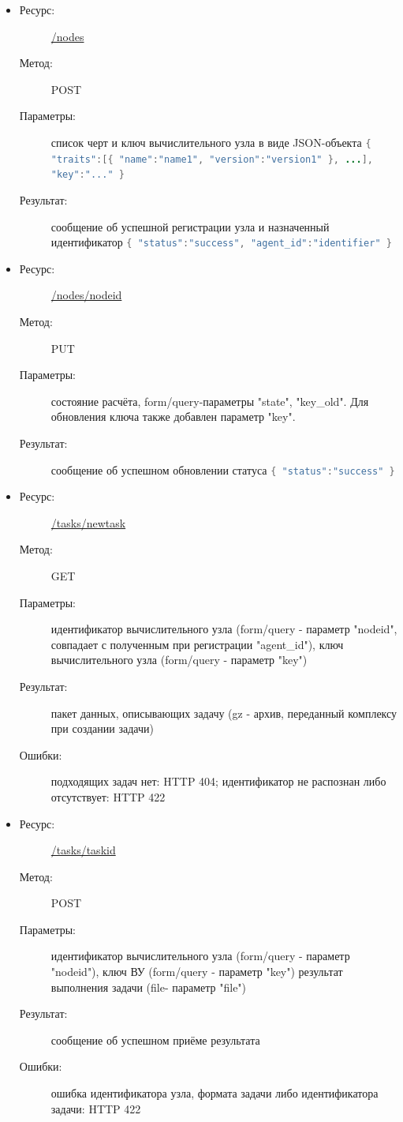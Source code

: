 \documentclass[a4paper,12pt]{report}
\numberwithin{equation}{section}
\begin{document}
  \begin{itemize}
    \item
    \begin{description}
      \item[Ресурс:] \url{/nodes}
      \item[Метод:] POST
      \item[Параметры:] список черт и ключ вычислительного узла в виде JSON-объекта
      \lstinline[language=Java]|{ "traits":[{ "name":"name1", "version":"version1" }, ...], "key":"..." }|
      \item[Результат:] сообщение об успешной регистрации узла и назначенный идентификатор 
      \lstinline[language=Java]|{ "status":"success", "agent_id":"identifier" }|
    \end{description}
    \item
    \begin{description}
      \item[Ресурс:] \url{/nodes/nodeid}
      \item[Метод:] PUT
      \item[Параметры:] состояние расчёта, 
      form/query-параметры "state", "key\_old". Для обновления ключа также добавлен параметр "key".
      \item[Результат:] сообщение об успешном обновлении статуса
      \lstinline[language=Java]|{ "status":"success" }|
    \end{description}
    \item
    \begin{description}
      \item[Ресурс:] \url{/tasks/newtask}
      \item[Метод:] GET
      \item[Параметры:] идентификатор вычислительного узла (form/query - параметр "nodeid", совпадает с полученным при регистрации "agent\_id"), ключ вычислительного узла (form/query - параметр "key")
      \item[Результат:] пакет данных, описывающих задачу (gz - архив, переданный комплексу при создании задачи)
      \item[Ошибки:] подходящих задач нет: HTTP 404; идентификатор не распознан либо отсутствует: HTTP 422
    \end{description}
    \item
    \begin{description}
      \item[Ресурс:] \url{/tasks/taskid}
      \item[Метод:] POST
      \item[Параметры:] идентификатор вычислительного узла (form/query - параметр "nodeid"), ключ ВУ (form/query - параметр "key") результат выполнения задачи (file- параметр "file")
      \item[Результат:] сообщение об успешном приёме результата
      \item[Ошибки:] ошибка идентификатора узла, формата задачи либо идентификатора задачи: HTTP 422
    \end{description}
  \end{itemize}
  
\end{document}
